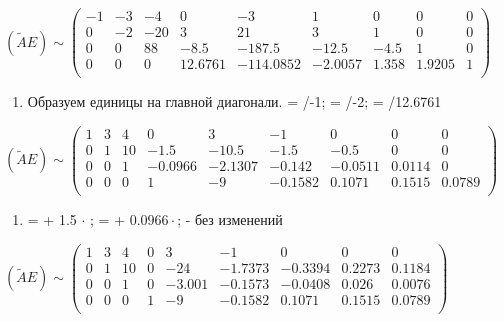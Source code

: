 \documentclass[10pt, a4paper]{scrartcl}
\begin{document}
\(\displaystyle (\widetilde{A}E) \sim \begin{pmatrix} -1 & -3 & -4 & 0 & -3 & 1 & 0 & 0 & 0\\ 0 & -2 & -20 & 3 & 21 & 3 & 1 & 0 & 0\\ 0 & 0 & 88 & -8.5 & -187.5 & -12.5 & -4.5 & 1 & 0\\ 0 & 0 & 0 & 12.6761 & -114.0852 & -2.0057 & 1.358 & 1.9205 & 1\\ \end{pmatrix}\)

\pagebreak

\begin{enumerate}
\def\labelenumi{\arabic{enumi})}
\setcounter{enumi}{3}
\itemsep1pt\parskip0pt
\item
  Образуем единицы на главной диагонали.
  \uppercase\expandafter{} =
  \uppercase\expandafter{}/-1;
  \uppercase\expandafter{} =
  \uppercase\expandafter{}/-2;
  \uppercase\expandafter{} =
  \uppercase\expandafter{}/12.6761
\end{enumerate}

\(\displaystyle (\widetilde{A}E) \sim \begin{pmatrix} 1 & 3 & 4 & 0 & 3 & -1 & 0 & 0 & 0\\ 0 & 1 & 10 & -1.5 & -10.5 & -1.5 & -0.5 & 0 & 0\\ 0 & 0 & 1 & -0.0966 & -2.1307 & -0.142 & -0.0511 & 0.0114 & 0\\ 0 & 0 & 0 & 1 & -9 & -0.1582 & 0.1071 & 0.1515 & 0.0789\\ \end{pmatrix}\)

\begin{enumerate}
\def\labelenumi{\arabic{enumi})}
\setcounter{enumi}{4}
\itemsep1pt\parskip0pt
\item
  \uppercase\expandafter{} =
  \uppercase\expandafter{} + 1.5 \(\cdot\)
  \uppercase\expandafter{};
  \uppercase\expandafter{} =
  \uppercase\expandafter{} +
  \(0.0966 \cdot\)\uppercase\expandafter{};
  \uppercase\expandafter{} - без изменений
\end{enumerate}

\(\displaystyle (\widetilde{A}E) \sim \begin{pmatrix} 1 & 3 & 4 & 0 & 3 & -1 & 0 & 0 & 0\\ 0 & 1 & 10 & 0 & -24 & -1.7373 & -0.3394 & 0.2273 & 0.1184\\ 0 & 0 & 1 & 0 & -3.001 & -0.1573 & -0.0408 & 0.026 & 0.0076\\ 0 & 0 & 0 & 1 & -9 & -0.1582 & 0.1071 & 0.1515 & 0.0789\\ \end{pmatrix}\)
\end{document}
